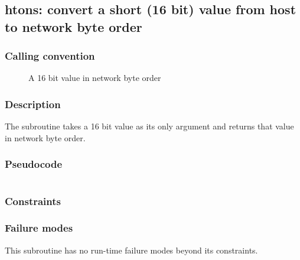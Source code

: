 \clearpage
{}
{}
\label{subr:htons}
\subsection*{htons: convert a short (16 bit) value from host to network
byte order}

\subsubsection*{Calling convention}

\begin{description}
\item[] A 16 bit value in network byte order
\end{description}

\subsubsection*{Description}

The  subroutine takes a 16 bit value as its only
argument and returns that value in network byte order.
\subsubsection*{Pseudocode}

\begin{verbatim}
\end{verbatim}

\subsubsection*{Constraints}

\subsubsection*{Failure modes}

This subroutine has no run-time failure modes beyond its constraints.
